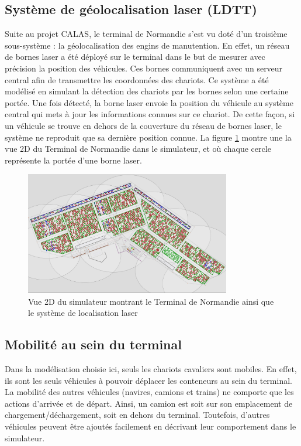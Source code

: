 \subsection{Système de géolocalisation laser (LDTT)}

Suite au projet CALAS, le terminal de Normandie s'est vu doté d'un troisième sous-système : la géolocalisation des engins de manutention. En effet, un réseau de bornes laser a été déployé sur le terminal dans le but de mesurer avec précision la position des véhicules. Ces bornes communiquent avec un serveur central afin de transmettre les coordonnées des chariots. Ce système a été modélisé en simulant la détection des chariots par les bornes selon une certaine portée. Une fois détecté, la borne laser envoie la position du véhicule au système central qui mets à jour les informations connues sur ce chariot. De cette façon, si un véhicule se trouve en dehors de la couverture du réseau de bornes laser, le système ne reproduit que sa dernière position connue. La figure \ref{fig:simulation:laser} montre une la vue 2D du Terminal de Normandie dans le simulateur, et où chaque cercle représente la portée d'une borne laser.

\begin{figure}[h]
 \centering
 \includegraphics[width=0.8\textwidth]{chapitres/simulation/captureBornesLaser.png}
 \caption{Vue 2D du simulateur montrant le Terminal de Normandie ainsi que le système de localisation laser}
 \label{fig:simulation:laser}
\end{figure}

\subsection{Mobilité au sein du terminal}

Dans la modélisation choisie ici, seuls les chariots cavaliers sont mobiles. En effet, ils sont les seuls véhicules à pouvoir déplacer les conteneurs au sein du terminal. La mobilité des autres véhicules (navires, camions et trains) ne comporte que les actions d'arrivée et de départ. Ainsi, un camion est soit sur son emplacement de chargement/déchargement, soit en dehors du terminal. Toutefois, d'autres véhicules peuvent être ajoutés facilement en décrivant leur comportement dans le
simulateur. 

